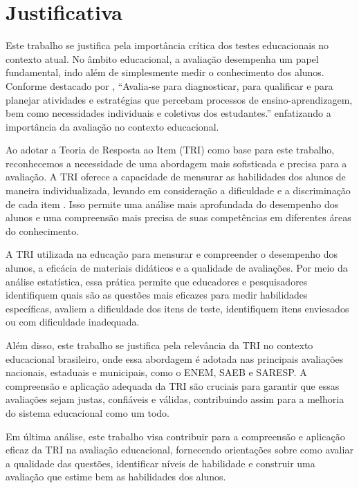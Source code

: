 \section{Justificativa}

Este trabalho se justifica pela importância crítica dos testes educacionais no contexto atual. 	No âmbito educacional, a avaliação desempenha um papel fundamental, indo além de simplesmente medir o conhecimento dos alunos. Conforme destacado por \cite{silva2019}, ``Avalia-se para diagnosticar, para qualificar e para planejar atividades e estratégias que percebam processos de ensino-aprendizagem, bem como necessidades individuais e coletivas dos estudantes.'' enfatizando a importância da avaliação no contexto educacional.

Ao adotar a Teoria de Resposta ao Item (TRI) como base para este trabalho, reconhecemos a necessidade de uma abordagem mais sofisticada e precisa para a avaliação. A TRI oferece a capacidade de mensurar as habilidades dos alunos de maneira individualizada, levando em consideração a dificuldade e a discriminação de cada item \cite{pasquali2018}. Isso permite uma análise mais aprofundada do desempenho dos alunos e uma compreensão mais precisa de suas competências em diferentes áreas do conhecimento.

A TRI utilizada na educação para mensurar e compreender o desempenho dos alunos, a eficácia de materiais didáticos e a qualidade de avaliações. Por meio da análise estatística, essa prática permite que educadores e pesquisadores identifiquem quais são as questões mais eficazes para medir habilidades específicas, avaliem a dificuldade dos itens de teste, identifiquem itens enviesados ou com dificuldade inadequada.

Além disso, este trabalho se justifica pela relevância da TRI no contexto educacional brasileiro, onde essa abordagem é adotada nas principais avaliações nacionais, estaduais e municipais, como o ENEM, SAEB e SARESP. A compreensão e aplicação adequada da TRI são cruciais para garantir que essas avaliações sejam justas, confiáveis e válidas, contribuindo assim para a melhoria do sistema educacional como um todo.


	Em última análise, este trabalho visa contribuir para a compreensão e aplicação eficaz da TRI na avaliação educacional, fornecendo orientações  sobre como avaliar a qualidade das questões, identificar níveis de habilidade e construir uma avaliação que estime bem as habilidades dos alunos. 





